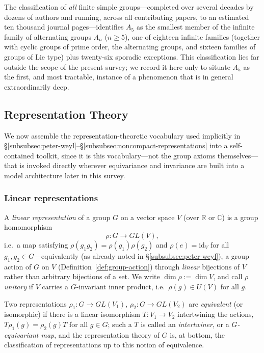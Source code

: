 \documentclass[mathematics,review,submit,moreauthors]{Definitions/mdpi}
\begin{document}
The classification of \emph{all} finite simple groups---completed over
several decades by dozens of authors and running, across all contributing
papers, to an estimated ten thousand journal pages---identifies $A_5$ as the
smallest member of the infinite family of alternating groups $A_n$
($n \geq 5$), one of eighteen infinite families (together with cyclic groups
of prime order, the alternating groups, and sixteen families of groups of
Lie type) plus twenty-six sporadic exceptions. This classification lies far
outside the scope of the present survey; we record it here only to situate
$A_5$ as the first, and most tractable, instance of a phenomenon that is in
general extraordinarily deep.

%
\subsection{Representation Theory}
\label{subsec:representation-theory}

We now assemble the representation-theoretic vocabulary used implicitly in
\S\ref{subsubsec:peter-weyl}--\S\ref{subsubsec:noncompact-representations}
into a self-contained toolkit, since it is this vocabulary---not the group
axioms themselves---that is invoked directly wherever equivariance and
invariance are built into a model architecture later in this survey.

\subsubsection{Linear representations}
\label{subsubsec:linear-representations}

\begin{Definition}
\label{def:linear-representation}
A \emph{linear representation} of a group $G$ on a vector space $V$ (over
$\mathbb{R}$ or $\mathbb{C}$) is a group homomorphism
\[
    \rho : G \longrightarrow GL(V),
\]
i.e.\ a map satisfying $\rho(g_1 g_2) = \rho(g_1)\rho(g_2)$ and
$\rho(e) = \mathrm{id}_V$ for all $g_1, g_2 \in G$---equivalently (as already
noted in \S\ref{subsubsec:peter-weyl}), a group action of $G$ on $V$
(Definition~\ref{def:group-action}) through \emph{linear} bijections of $V$
rather than arbitrary bijections of a set. We write $\dim \rho := \dim V$,
and call $\rho$ \emph{unitary} if $V$ carries a $G$-invariant inner product,
i.e.\ $\rho(g) \in U(V)$ for all $g$.
\end{Definition}

Two representations $\rho_1 : G \to GL(V_1)$, $\rho_2 : G \to GL(V_2)$ are
\emph{equivalent} (or isomorphic) if there is a linear isomorphism
$T : V_1 \to V_2$ intertwining the actions,
$T \rho_1(g) = \rho_2(g) T$ for all $g \in G$; such a $T$ is called an
\emph{intertwiner}, or a \emph{$G$-equivariant map}, and the representation
theory of $G$ is, at bottom, the classification of representations up to
this notion of equivalence.
\end{document}

